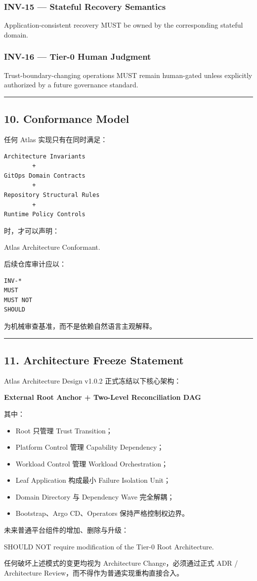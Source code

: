 \documentclass[11pt,a4paper]{article}
\begin{document}
\subsubsection{INV-15 — Stateful Recovery Semantics}
Application-consistent recovery MUST be owned by the corresponding stateful domain.

\subsubsection{INV-16 — Tier-0 Human Judgment}
Trust-boundary-changing operations MUST remain human-gated unless explicitly authorized by a future governance standard.

\vspace{0.5em}\hrule\vspace{0.5em}
\subsection{10. Conformance Model}
任何 Atlas 实现只有在同时满足：

\begin{lstlisting}[language=text]
Architecture Invariants
        +
GitOps Domain Contracts
        +
Repository Structural Rules
        +
Runtime Policy Controls
\end{lstlisting}
时，才可以声明：

\begin{gfmBlockquote}
Atlas Architecture Conformant.
\end{gfmBlockquote}
后续仓库审计应以：

\begin{lstlisting}[language=text]
INV-*
MUST
MUST NOT
SHOULD
\end{lstlisting}
为机械审查基准，而不是依赖自然语言主观解释。

\vspace{0.5em}\hrule\vspace{0.5em}
\subsection{11. Architecture Freeze Statement}
Atlas Architecture Design v1.0.2 正式冻结以下核心架构：

\begin{gfmBlockquote}
\textbf{External Root Anchor + Two-Level Reconciliation DAG}
\end{gfmBlockquote}
其中：

\begin{itemize}
  \item Root 只管理 Trust Transition；
  \item Platform Control 管理 Capability Dependency；
  \item Workload Control 管理 Workload Orchestration；
  \item Leaf Application 构成最小 Failure Isolation Unit；
  \item Domain Directory 与 Dependency Wave 完全解耦；
  \item Bootstrap、Argo CD、Operators 保持严格控制权边界。
\end{itemize}
未来普通平台组件的增加、删除与升级：

\begin{gfmBlockquote}
SHOULD NOT require modification of the Tier-0 Root Architecture.
\end{gfmBlockquote}
任何破坏上述模式的变更均视为 Architecture Change，必须通过正式 ADR / Architecture Review，而不得作为普通实现重构直接合入。
\end{document}
